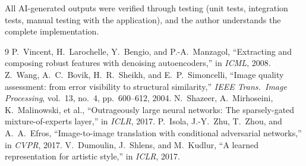 \documentclass[conference]{IEEEtran}
\begin{document}
All AI-generated outputs were verified through testing (unit tests, integration tests, manual testing with the application), and the author understands the complete implementation.

\begin{thebibliography}{9}
 P.~Vincent, H.~Larochelle, Y.~Bengio, and P.-A.~Manzagol, ``Extracting and composing robust features with denoising autoencoders,'' in \emph{ICML}, 2008.
 Z.~Wang, A.~C.~Bovik, H.~R.~Sheikh, and E.~P.~Simoncelli, ``Image quality assessment: from error visibility to structural similarity,'' \emph{IEEE Trans.\ Image Processing}, vol.~13, no.~4, pp.~600--612, 2004.
 N.~Shazeer, A.~Mirhoseini, K.~Malinowski, et al., ``Outrageously large neural networks: The sparsely-gated mixture-of-experts layer,'' in \emph{ICLR}, 2017.
 P.~Isola, J.-Y.~Zhu, T.~Zhou, and A.~A.~Efros, ``Image-to-image translation with conditional adversarial networks,'' in \emph{CVPR}, 2017.
 V.~Dumoulin, J.~Shlens, and M.~Kudlur, ``A learned representation for artistic style,'' in \emph{ICLR}, 2017.
\end{thebibliography}
\end{document}
